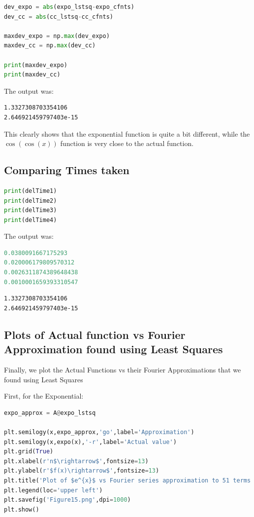 \documentclass[12pt]{article}
\begin{document}
\begin{lstlisting}[language=Python]
dev_expo = abs(expo_lstsq-expo_cfnts)
dev_cc = abs(cc_lstsq-cc_cfnts)

maxdev_expo = np.max(dev_expo)
maxdev_cc = np.max(dev_cc)

print(maxdev_expo)
print(maxdev_cc)
\end{lstlisting}

The output was:

\begin{lstlisting}
1.3327308703354106
2.646921459797403e-15
\end{lstlisting}

This clearly shows that the exponential function is quite a bit different, while the $\cos(\cos(x))$ function is very close to the actual function.

\subsection{Comparing Times taken}

\begin{lstlisting}[language=Python]
print(delTime1)
print(delTime2)
print(delTime3)
print(delTime4)
\end{lstlisting}

The output was:

\begin{lstlisting}[language=Python]
0.0380091667175293
0.020006179809570312
0.0026311874389648438
0.0010001659393310547
\end{lstlisting}

\begin{lstlisting}
1.3327308703354106
2.646921459797403e-15
\end{lstlisting}


\subsection{Plots of Actual function vs Fourier Approximation found using Least Squares}

Finally, we plot the Actual Functions vs their Fourier Approximations that we found using Least Squares

First, for the Exponential:

\begin{lstlisting}[language=Python]
expo_approx = A@expo_lstsq

plt.semilogy(x,expo_approx,'go',label='Approximation')
plt.semilogy(x,expo(x),'-r',label='Actual value')
plt.grid(True)
plt.xlabel(r'n$\rightarrow$',fontsize=13)
plt.ylabel(r'$f(x)\rightarrow$',fontsize=13)
plt.title('Plot of $e^{x}$ vs Fourier series approximation to 51 terms',fontsize=16)
plt.legend(loc='upper left')
plt.savefig('Figure15.png',dpi=1000)
plt.show()

\end{lstlisting}
\end{document}
